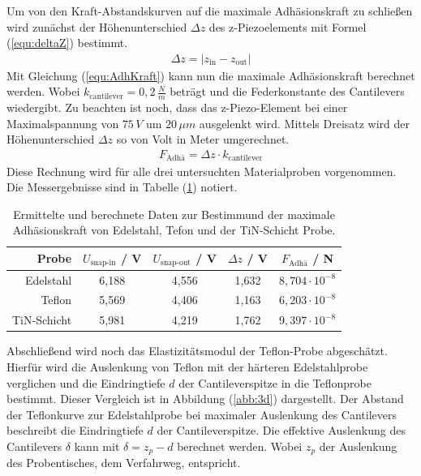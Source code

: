 Um von den Kraft-Abstandskurven auf die maximale Adh\"asionskraft zu schlie{\ss}en wird zun\"achst der Höhenunterschied $\Delta z$ des z-Piezoelements mit Formel (\ref{equ:deltaZ}) bestimmt.
\begin{align}
	\Delta z = \left\vert z_{\text{in}} - z_{\text{out}} \right\vert
\label{equ:deltaZ}
\end{align}
Mit Gleichung (\ref{equ:AdhKraft}) kann nun die maximale Adh\"asionskraft berechnet werden.
Wobei $k_{\text{cantilever}} = 0,2 \, \frac{N}{m}$ betr\"agt und die Federkonstante des Cantilevers wiedergibt.
Zu beachten ist noch, dass das z-Piezo-Element bei einer Maximalspannung von $75 \, V$ um $20 \, \mu m$ ausgelenkt wird.
Mittels Dreisatz wird der Höhenunterschied $\Delta z$ so von Volt in Meter umgerechnet.
\begin{align}
	F_{\text{Adh\"a}} = \Delta z \cdot k_{\text{cantilever}}
\label{equ:AdhKraft}
\end{align}
Diese Rechnung wird f\"ur alle drei untersuchten Materialproben vorgenommen.
Die Messergebnisse sind in Tabelle (\ref{tab:auf3}) notiert.
\begin{table}
	\centering
	\caption{Ermittelte und berechnete Daten zur Bestimmund der maximale Adhäsionskraft von Edelstahl, Tefon und der TiN-Schicht Probe.}
\begin{tabular}{|r|cccc|}
	\hline
	{Probe} & {$U_{\text{snap-in}}$} / V & {$U_{\text{snap-out}}$} / V & $\Delta z$ / V & {$F_{\text{Adh\"a}}$} / N \\
	\hline
	Edelstahl & 6,188 & 4,556 & 1,632 & $8,704 \cdot 10^{-8}$ \\
	Teflon	& 5,569 & 4,406 & 1,163 & $6,203 \cdot 10^{-8}$ \\
	TiN-Schicht & 5,981 & 4,219 & 1,762 & $9,397 \cdot 10^{-8}$ \\
	\hline
\end{tabular}
\label{tab:auf3}
\end{table}
Abschlie{\ss}end wird noch das Elastizitätsmodul der Teflon-Probe abgesch\"atzt.
Hierf\"ur wird die Auslenkung von Teflon mit der h\"arteren Edelstahlprobe verglichen und die Eindringtiefe $d$ der Cantileverspitze in die Teflonprobe bestimmt.
Dieser Vergleich ist in Abbildung (\ref{abb:3d}) dargestellt.
Der Abstand der Teflonkurve zur Edelstahlprobe bei maximaler Auslenkung des Cantilevers beschreibt die Eindringtiefe $d$ der Cantileverspitze.
Die effektive Auslenkung des Cantilevers $\delta$ kann mit $\delta = z_p - d$ berechnet werden.
Wobei $z_p$ der Auslenkung des Probentisches, dem Verfahrweg, entspricht.
